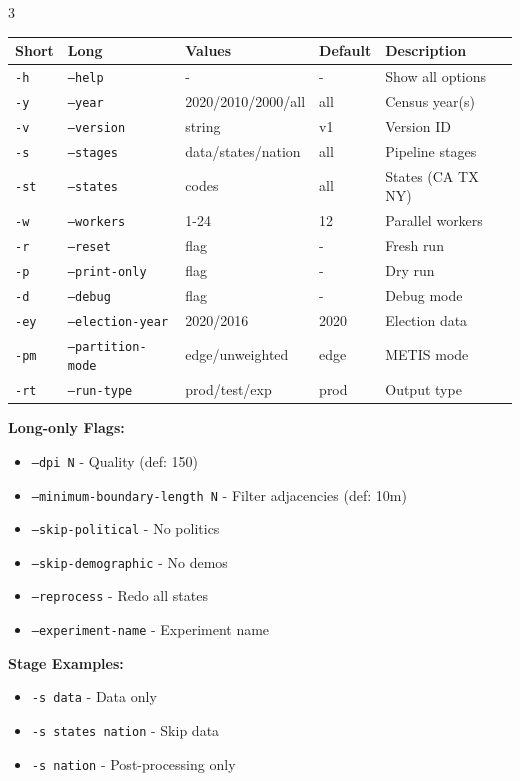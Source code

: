 \documentclass[10pt,landscape]{article}
\begin{document}
\begin{multicols}{3}
\begin{small}
\begin{tabular}{|l|l|p{3cm}|l|p{3cm}|}
\hline
\textbf{Short} & \textbf{Long} & \textbf{Values} & \textbf{Default} & \textbf{Description} \\
\hline
\texttt{-h} & \texttt{--help} & - & - & Show all options \\
\texttt{-y} & \texttt{--year} & 2020/2010/2000/all & all & Census year(s) \\
\texttt{-v} & \texttt{--version} & string & v1 & Version ID \\
\texttt{-s} & \texttt{--stages} & data/states/nation & all & Pipeline stages \\
\texttt{-st} & \texttt{--states} & codes & all & States (CA TX NY) \\
\texttt{-w} & \texttt{--workers} & 1-24 & 12 & Parallel workers \\
\texttt{-r} & \texttt{--reset} & flag & - & Fresh run \\
\texttt{-p} & \texttt{--print-only} & flag & - & Dry run \\
\texttt{-d} & \texttt{--debug} & flag & - & Debug mode \\
\texttt{-ey} & \texttt{--election-year} & 2020/2016 & 2020 & Election data \\
\texttt{-pm} & \texttt{--partition-mode} & edge/unweighted & edge & METIS mode \\
\texttt{-rt} & \texttt{--run-type} & prod/test/exp & prod & Output type \\
\hline
\end{tabular}
\end{small}

\vspace{4pt}

\textbf{Long-only Flags:}
\begin{itemize}\itemsep0pt
\item \texttt{--dpi N} - Quality (def: 150)
\item \texttt{--minimum-boundary-length N} - Filter adjacencies (def: 10m)
\item \texttt{--skip-political} - No politics
\item \texttt{--skip-demographic} - No demos
\item \texttt{--reprocess} - Redo all states
\item \texttt{--experiment-name} - Experiment name
\end{itemize}

\textbf{Stage Examples:}
\begin{itemize}\itemsep0pt
\item \texttt{-s data} - Data only
\item \texttt{-s states nation} - Skip data
\item \texttt{-s nation} - Post-processing only
\end{itemize}


\end{multicols}
\end{document}
